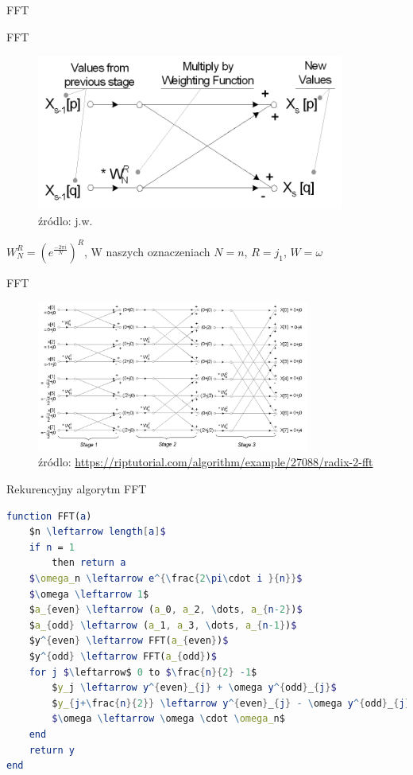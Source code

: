 \begin{frame}[allowframebreaks]{FFT}
\end{frame}  
\begin{frame}{FFT}
\begin{figure}
	    \centering
	   \includegraphics[width=0.9\textwidth]{img/16/bloczek_motyl.png}
	    \caption{źródlo: j.w.}
	    \label{fig:my_label}
	\end{figure}
    $W_{N}^R=(e^{\frac{-2\pi i}{N}})^R$, W naszych oznaczeniach $N=n$, $R=j_1$, $W=\omega$
\end{frame}
\begin{frame}{FFT}
    \begin{figure}
	    \centering
	   \includegraphics[width=0.8\textwidth]{img/16/motyl.png}
	    \caption{źródlo: \url{https://riptutorial.com/algorithm/example/27088/radix-2-fft}}
	    \label{fig:my_label}
	\end{figure}
\end{frame}
\begin{frame}[fragile]{Rekurencyjny algorytm FFT}
\begin{lstlisting}[language=Mathematica, mathescape]
function FFT(a)
	$n \leftarrow length[a]$
	if n = 1 
		then return a
	$\omega_n \leftarrow e^{\frac{2\pi\cdot i }{n}}$
	$\omega \leftarrow 1$
	$a_{even} \leftarrow (a_0, a_2, \dots, a_{n-2})$
	$a_{odd} \leftarrow (a_1, a_3, \dots, a_{n-1})$
	$y^{even} \leftarrow FFT(a_{even})$
	$y^{odd} \leftarrow FFT(a_{odd})$
	for j $\leftarrow$ 0 to $\frac{n}{2} -1$
		$y_j \leftarrow y^{even}_{j} + \omega y^{odd}_{j}$
		$y_{j+\frac{n}{2}} \leftarrow y^{even}_{j} - \omega y^{odd}_{j} $
		$\omega \leftarrow \omega \cdot \omega_n$
	end	
	return y
end
\end{lstlisting}

\end{frame}
